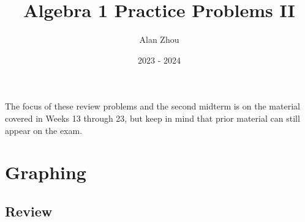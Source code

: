 \documentclass{article}
\title{Algebra 1 Practice Problems II}
\author{Alan Zhou}
\date{2023 - 2024}
\begin{document}
\maketitle

The focus of these review problems and the second midterm is on the material covered in Weeks 13 through 23, but keep in mind that prior material can still appear on the exam.

\tableofcontents


\newpage
\section{Graphing}

\subsection{Review}
\end{document}

